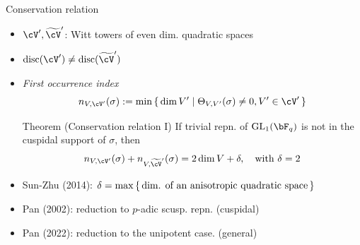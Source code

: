 \documentclass[t,mathserif,11pt,usenames,dvipsnames]{beamer}
\theoremstyle{plain}
\theoremstyle{definition}
\def\GL{\mathrm{GL}}
\def\Ind{{\rm Ind}}
\def\blue{\color{blue}}
\let\oldemph\emph
\def\emph#1{\oldemph{\blue #1}}
\begin{document}
\def\wtcV{{\widetilde{\cV}}}
\def\tcV{{\widetilde{\cV}}}

\begin{frame}{Conservation relation}
  \begin{itemize}
    \item $\cV', \wtcV'$: Witt towers of even dim. quadratic spaces
    \item[] \hfill$\mathrm{disc} (\cV') \neq \mathrm{disc}(\wtcV')$\hfill\ \pause
    \item \emph{First occurrence index} \vspace{-.5em}
          \[
          n_{V,\cV'}(\sigma) := \min \set{\dim V'| \Theta_{V,V'}(\sigma)\neq 0, V'\in \cV' }
          \]\pause
          \vspace{-2em}

  \begin{block}{Theorem (Conservation relation I)}
    If trivial repn. of $\GL_{1}(\bF_{q})$ is not in the cuspidal support of $\sigma$, then
    \[
      n_{V,\cV'}(\sigma) + n_{V, \wtcV'}(\sigma) = 2\dim V + \delta, \quad \text{with
      }\delta=2
    \]
  \end{block}\pause
  \item Sun-Zhu (2014): $ \delta=\max\set{\text{dim. of an anisotropic quadratic
          space}}$ \pause
  \item Pan (2002): reduction to $p$-adic scusp. repn. (cuspidal)
  \item Pan (2022): reduction to the unipotent  case. (general)
  \end{itemize}
\end{frame}
\end{document}

